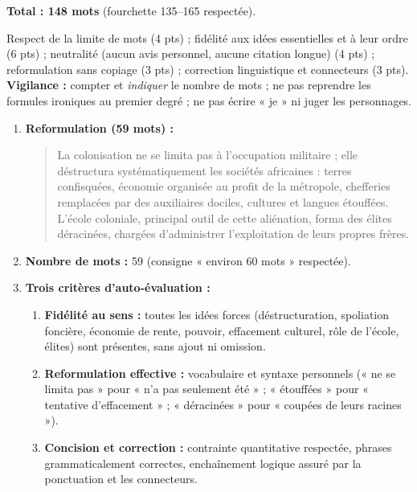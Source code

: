 \documentclass[11pt]{article}
\begin{document}
\begin{corrige}
\begin{enumerate}
\begin{quote}
    \end{quote}
    \textbf{Total : 148 mots} (fourchette 135--165 respectée).
\end{enumerate}
\end{corrige}

\begin{attention}
Respect de la limite de mots (4 pts) ; fidélité aux idées essentielles et à leur ordre (6 pts) ; neutralité (aucun avis personnel, aucune citation longue) (4 pts) ; reformulation sans copiage (3 pts) ; correction linguistique et connecteurs (3 pts). \textbf{Vigilance :} compter et \emph{indiquer} le nombre de mots ; ne pas reprendre les formules ironiques au premier degré ; ne pas écrire « je » ni juger les personnages.
\end{attention}

\begin{corrige}
\begin{enumerate}
    \item \textbf{Reformulation (59 mots) :}
    \begin{quote}
    La colonisation ne se limita pas à l'occupation militaire ; elle déstructura systématiquement les sociétés africaines : terres confisquées, économie organisée au profit de la métropole, chefferies remplacées par des auxiliaires dociles, cultures et langues étouffées. L'école coloniale, principal outil de cette aliénation, forma des élites déracinées, chargées d'administrer l'exploitation de leurs propres frères.
    \end{quote}
    \item \textbf{Nombre de mots :} 59 (consigne « environ 60 mots » respectée).
    \item \textbf{Trois critères d'auto-évaluation :}
    \begin{enumerate}
        \item \textbf{Fidélité au sens :} toutes les idées forces (déstructuration, spoliation foncière, économie de rente, pouvoir, effacement culturel, rôle de l'école, élites) sont présentes, sans ajout ni omission.
        \item \textbf{Reformulation effective :} vocabulaire et syntaxe personnels (« ne se limita pas » pour « n'a pas seulement été » ; « étouffées » pour « tentative d'effacement » ; « déracinées » pour « coupées de leurs racines »).
        \item \textbf{Concision et correction :} contrainte quantitative respectée, phrases grammaticalement correctes, enchaînement logique assuré par la ponctuation et les connecteurs.
    \end{enumerate}
\end{enumerate}
\end{corrige}
\end{document}
